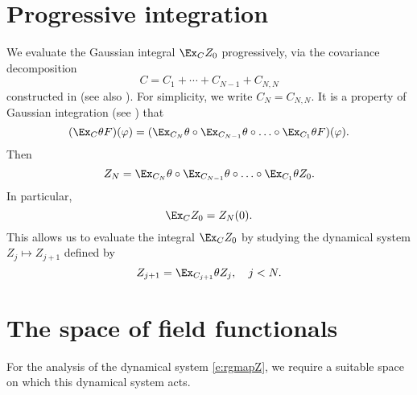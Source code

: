 
\section{Progressive integration}
\label{sec:prog}

We evaluate the Gaussian integral $\Ex_C Z_0$ progressively, via
the covariance decomposition
\begin{equation}
\label{e:NCj}
C = C_1 + \cdots + C_{N-1} + C_{N,N}
\end{equation}
constructed in \cite{Baue13a} (see also \cite{BGM04}). For simplicity, we write $C_N = C_{N,N}$.
It is a property of Gaussian integration (see \cite{BS-rg-norm}) that
\begin{equation}
	(\Ex_C \theta F)(\varphi)
	=
	(\Ex_{C_N}\theta \circ \Ex_{C_{N-1}}\theta \circ \ldots \circ \Ex_{C_1}\theta F)
	(\varphi).
\end{equation}
Then
\begin{equation}
Z_N
=
\Ex_{C_N}\theta \circ \Ex_{C_{N-1}}\theta \circ \ldots \circ \Ex_{C_1}\theta Z_0.
\end{equation}
In particular,
\begin{equation}
\label{e:exp-conv}
\Ex_C Z_0 = Z_N(0).
\end{equation}
This allows us to evaluate the integral $\Ex_C Z_0$ by studying the
dynamical system $Z_j \mapsto Z_{j+1}$ defined by
\begin{equation}
\label{e:rgmapZ}
Z_{j+1} = \Ex_{C_{j+1}} \theta Z_j, \quad j < N.
\end{equation}


\section{The space of field functionals}

For the analysis of the dynamical system \eqref{e:rgmapZ}, we require a suitable
space on which this dynamical system acts.

